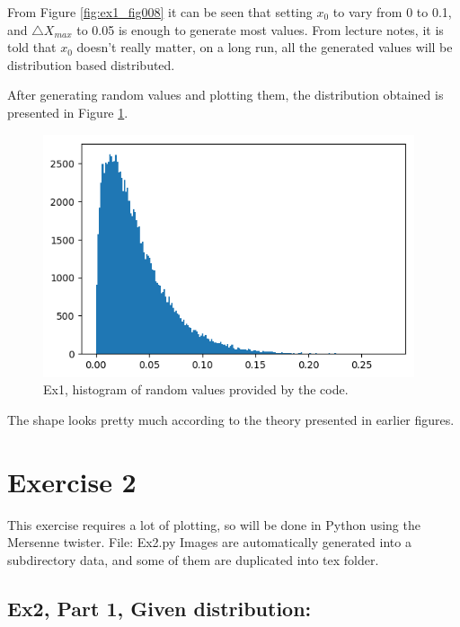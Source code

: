 \documentclass{article}
\begin{document}
From Figure \ref{fig:ex1_fig008} it can be seen that setting $x_0$ to vary from 0 to 0.1, and $\triangle X_{max}$ to 0.05 is enough to generate most values. From lecture notes, it is told that $x_0$ doesn't really matter, on a long run, all the generated values will be distribution based distributed.

After generating random values and plotting them, the distribution obtained is presented in Figure \ref{fig:ex1_myDistribution}.

\begin{figure}[!hbt]
	\centering
	\includegraphics[width=4.3in]{ex1_myDistribution}
	\caption{Ex1, histogram of random values provided by the code.}
	\label{fig:ex1_myDistribution}
\end{figure}

The shape looks pretty much according to the theory presented in earlier figures.


\clearpage

\section{Exercise 2}
This exercise requires a lot of plotting, so will be done in Python using the Mersenne twister. File: Ex2.py
Images are automatically generated into a subdirectory data, and some of them are duplicated into tex folder.

\subsection*{Ex2, Part 1, Given distribution:}
\end{document}
